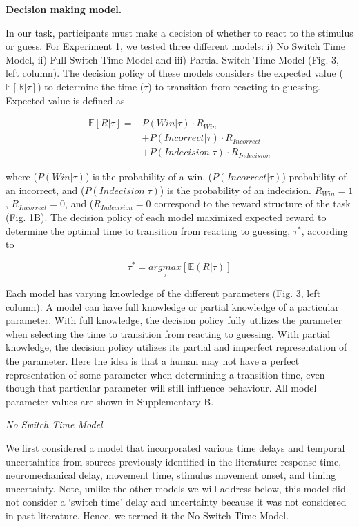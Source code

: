 \documentclass[12pt,letterpaper]{article}
\begin{document}
\noindent\textbf{\textcolor{mydarkblue}{{Decision making model.}}}

In our task, participants must make a decision of whether to react to the stimulus or guess. For Experiment 1, we tested three different models:  i) No Switch Time Model, ii) Full Switch Time Model and iii) Partial Switch Time Model (Fig. 3, left column). The decision policy of these models considers the expected value ($\mathbb{E[R|\tau]}$) to determine the time ($\tau$) to transition from reacting to guessing. Expected value is defined as

\begin{align}
    \mathbb{E}[R|\tau] = & P(Win|\tau) \cdot R_{Win} \nonumber \\ &+ P(Incorrect|\tau) \cdot R_{Incorrect} \nonumber \\ &+ P(Indecision|\tau) \cdot R_{Indecision}
\end{align}

where ($P(Win|\tau)$) is the probability of a win, ($P(Incorrect|\tau)$) probability of an incorrect, and ($P(Indecision|\tau)$) is the probability of an indecision. $R_{Win} = 1$, $R_{Incorrect} = 0$, and ($R_{Indecision} = 0$ correspond to the reward structure of the task (Fig. 1B). The decision policy of each model maximized expected reward to determine the optimal time to transition from reacting to guessing, $\tau^*$, according to

\begin{equation}
    \tau^* = \underset{\tau}{argmax}[\mathbb{E}(R|\tau)]
\end{equation}

Each model has varying knowledge of the different parameters (Fig. 3, left column). A model can have full knowledge or partial knowledge of a particular parameter. With full knowledge, the decision policy fully utilizes the parameter when selecting the time to transition from reacting to guessing. With partial knowledge, the decision policy utilizes its partial and imperfect representation of the parameter. Here the idea is that a human may not have a perfect representation of some parameter when determining a transition time, even though that particular parameter will still influence behaviour. All model parameter values are shown in Supplementary B.

\noindent\emph{\textcolor{mydarkblue}{{No Switch Time Model}}}

We first considered a model that incorporated various time delays and temporal uncertainties from sources previously identified in the literature: response time, neuromechanical delay, movement time, stimulus movement onset, and timing uncertainty. Note, unlike the other models we will address below, this model did not consider a `switch time’ delay and uncertainty because it was not considered in past literature. Hence, we termed it the No Switch Time Model.
\end{document}
